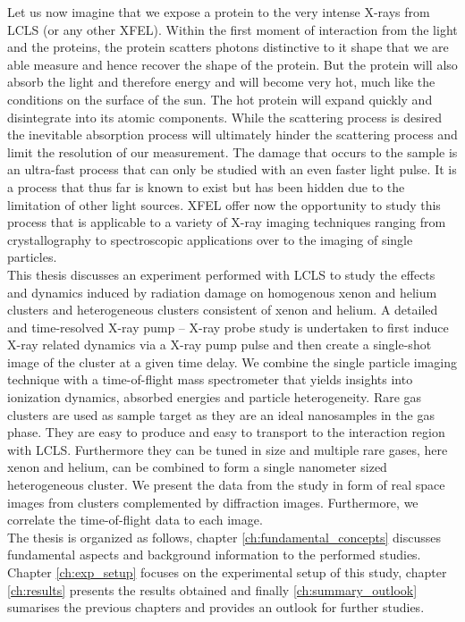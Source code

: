 Let us now imagine that we expose a protein to the very intense X-rays from LCLS (or any other XFEL). Within the first moment of interaction from the light and the proteins, the protein scatters photons distinctive to it shape that we are able measure and hence recover the shape of the protein. But the protein will also absorb the light and therefore energy and will become very hot, much like the conditions on the surface of the sun. The hot protein will expand quickly and disintegrate into its atomic components. While the scattering process is desired the inevitable absorption process will ultimately hinder the scattering process and limit the resolution of our measurement. The damage that occurs to the sample is an ultra-fast process that can only be studied with an even faster light pulse. It is a process that thus far is known to exist but has been hidden due to the limitation of other light sources. XFEL offer now the opportunity to study this process that is applicable to a variety of X-ray imaging techniques ranging from crystallography to spectroscopic applications over to the imaging of single particles.\\
This thesis discusses an experiment performed with LCLS to study the effects and dynamics induced by radiation damage on homogenous xenon and helium clusters and heterogeneous clusters consistent of xenon and helium. A detailed and time-resolved X-ray pump -- X-ray probe study is undertaken to first induce X-ray related dynamics via a X-ray pump pulse and then create a single-shot image of the cluster at a given time delay. We combine the single particle imaging technique with a time-of-flight mass spectrometer that yields insights into ionization dynamics, absorbed energies and particle heterogeneity. Rare gas clusters are used as sample target as they are an ideal nanosamples in the gas phase. They are easy to produce and easy to transport to the interaction region with LCLS. Furthermore they can be tuned in size and multiple rare gases, here xenon and helium, can be combined to form a single nanometer sized heterogeneous cluster. We present the data from the study in form of real space images from clusters complemented by diffraction images. Furthermore, we correlate the time-of-flight data to each image.\\
The thesis is organized as follows, chapter \ref{ch:fundamental_concepts} discusses fundamental aspects and background information to the performed studies. Chapter \ref{ch:exp_setup} focuses on the experimental setup of this study, chapter \ref{ch:results} presents the results obtained and finally \ref{ch:summary_outlook} sumarises the previous chapters and provides an outlook for further studies.
%
%
%